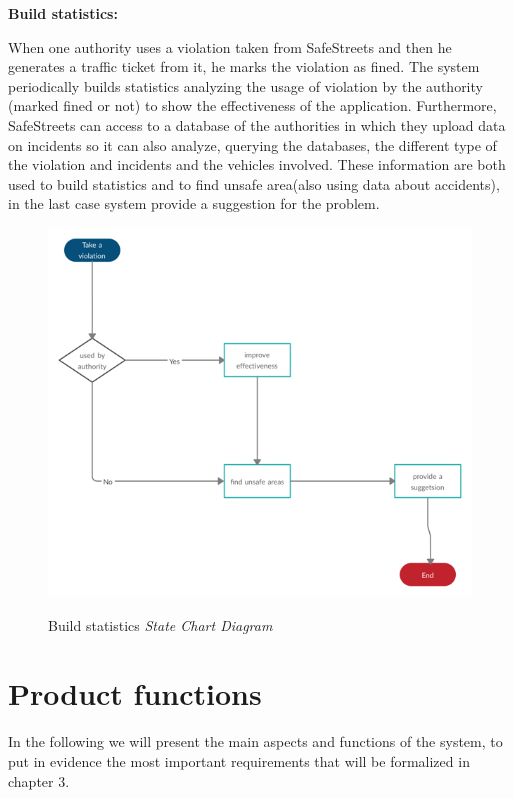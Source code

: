 \documentclass[../RASD.tex]{subfiles}
\begin{document}
    \textbf{Build statistics:}

    When one authority uses a violation taken from SafeStreets and then he generates a traffic ticket from it, he marks the violation as fined.
    The system periodically builds statistics analyzing the usage of violation by the authority (marked fined or not) to show the effectiveness of the application.
    Furthermore, SafeStreets can access to a database of the authorities in which they upload data on incidents so
    it can also analyze, querying the databases, the different type of the violation and incidents and the vehicles involved.
    These information are both used to build statistics and to find unsafe area(also using data about accidents),
    in the last case system provide a suggestion for the problem.

    \begin{figure}[H]
        \centering
        \includegraphics[scale = 3]{assets/buildStatistics.png}\\[1.6 cm]
        \caption[ Build statistics \textit{State Chart Diagram}]{ Build statistics \textit{State Chart Diagram}}
    \end{figure}

    \section{Product functions}\label{sec:product-functions}
    In the following we will present the main aspects and functions of the system, to put in evidence the most important requirements that will be formalized in chapter 3.
\end{document}
